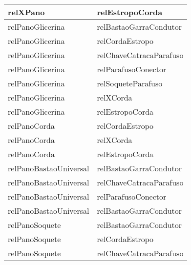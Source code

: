 \begin{center}
\begin{longtable}[H]{|l|l|}
relXPano                                        & relEstropoCorda                                  \\ \hline
relPanoGlicerina                                & relBastaoGarraCondutor                           \\ \hline
relPanoGlicerina                                & relCordaEstropo                                  \\ \hline
relPanoGlicerina                                & relChaveCatracaParafuso                          \\ \hline
relPanoGlicerina                                & relParafusoConector                              \\ \hline
relPanoGlicerina                                & relSoqueteParafuso                               \\ \hline
relPanoGlicerina                                & relXCorda                                        \\ \hline
relPanoGlicerina                                & relEstropoCorda                                  \\ \hline
relPanoCorda                                    & relCordaEstropo                                  \\ \hline
relPanoCorda                                    & relXCorda                                        \\ \hline
relPanoCorda                                    & relEstropoCorda                                  \\ \hline
relPanoBastaoUniversal                          & relBastaoGarraCondutor                           \\ \hline
relPanoBastaoUniversal                          & relChaveCatracaParafuso                          \\ \hline
relPanoBastaoUniversal                          & relParafusoConector                              \\ \hline
relPanoBastaoUniversal                          & relBastaoGarraCondutor                           \\ \hline
relPanoSoquete                                  & relBastaoGarraCondutor                           \\ \hline
relPanoSoquete                                  & relCordaEstropo                                  \\ \hline
relPanoSoquete                                  & relChaveCatracaParafuso                          \\ \hline

\end{longtable}
\end{center}
